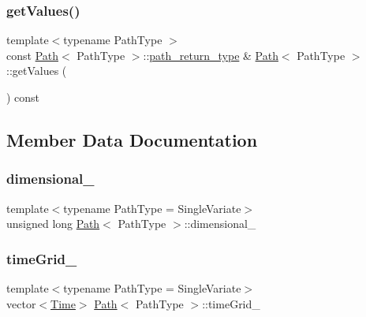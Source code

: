 \hypertarget{class_path_a2490ad69198170463f98c7d8f7212917}{}\label{class_path_a2490ad69198170463f98c7d8f7212917} 
\subsubsection{\texorpdfstring{get\+Values()}{getValues()}\hspace{0.1cm}{\footnotesize\ttfamily [2/2]}}
{\footnotesize\ttfamily template$<$typename Path\+Type $>$ \\
const \hyperlink{class_path}{Path}$<$ Path\+Type $>$\+::\hyperlink{class_path_a3b1c34a87f7867f6fed2e0a33f801e7d}{path\+\_\+return\+\_\+type} \& \hyperlink{class_path}{Path}$<$ Path\+Type $>$\+::get\+Values (\begin{DoxyParamCaption}{ }\end{DoxyParamCaption}) const\hspace{0.3cm}{\ttfamily [virtual]}}



\subsection{Member Data Documentation}
\hypertarget{class_path_ad71125972f4c21aa8233b08dea6fca13}{}\label{class_path_ad71125972f4c21aa8233b08dea6fca13} 
\subsubsection{\texorpdfstring{dimensional\+\_\+}{dimensional\_}}
{\footnotesize\ttfamily template$<$typename Path\+Type = Single\+Variate$>$ \\
unsigned long \hyperlink{class_path}{Path}$<$ Path\+Type $>$\+::dimensional\+\_\+\hspace{0.3cm}{\ttfamily [private]}}

\hypertarget{class_path_a23350d9575ae171881cd45dc1ce2a701}{}\label{class_path_a23350d9575ae171881cd45dc1ce2a701} 
\subsubsection{\texorpdfstring{time\+Grid\+\_\+}{timeGrid\_}}
{\footnotesize\ttfamily template$<$typename Path\+Type = Single\+Variate$>$ \\
vector$<$\hyperlink{_name_def_8h_ac2d3e0ba793497bcca555c7c2cf64ff3}{Time}$>$ \hyperlink{class_path}{Path}$<$ Path\+Type $>$\+::time\+Grid\+\_\+\hspace{0.3cm}{\ttfamily [private]}}


